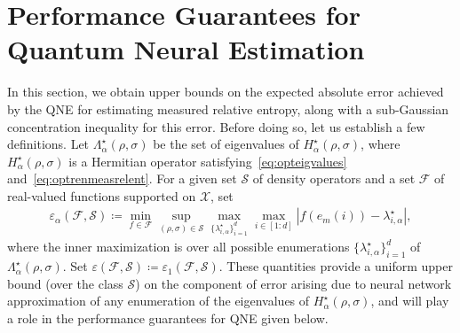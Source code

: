 \documentclass[a4paper,onecolumn,11pt,accepted=2026-05-12]{quantumarticle}
\newcommand{\abs}[1]{\left\vert#1\right\vert}
\newcommand{\cF}{\mathcal{F}}
\newcommand{\cS}{\mathcal{S}}
\newcommand{\cX}{\mathcal{X}}
\begin{document}
 \section{Performance Guarantees for Quantum Neural Estimation}\label{Sec:minimaxriskbnds}
 In this section, we obtain upper bounds on the expected absolute error achieved by the QNE for estimating measured relative entropy, along with a sub-Gaussian  concentration inequality for this error. 
Before doing so, let us establish a few definitions. 
Let  $\Lambda_{\alpha}^{\star}(\rho,\sigma)$  be the set of eigenvalues of $H_{\alpha}^{\star}(\rho,\sigma)$, where $H_{\alpha}^{\star}(\rho,\sigma)$ is a Hermitian operator satisfying~\eqref{eq:opteigvalues} and~\eqref{eq:optrenmeasrelent}. For a given set $ \cS$ of density operators and a set $\cF$ of real-valued functions supported on $\cX$, set 
   \begin{align}
     \varepsilon_{\alpha}(\cF,\cS) \coloneqq \min_{f \in \cF} \sup_{(\rho,\sigma) \in \cS}\max_{\{\lambda_{i,\alpha}^{\star}\}_{i=1}^d }\max_{i \in [1:d]} \abs{f(e_m(i))-\lambda_{i,\alpha}^{\star}},\label{eq:approxcond} 
   \end{align} 
   where the inner maximization is over all possible enumerations $\{\lambda_{i,\alpha}^{\star}\}_{i=1}^d$ of $\Lambda_{\alpha}^{\star}(\rho,\sigma)$. Set $\varepsilon(\cF,\cS) \coloneqq   \varepsilon_{1}(\cF,\cS)$. These quantities provide a uniform upper bound  (over the class $\cS$) on the component of error arising due to neural network approximation of any enumeration of the eigenvalues of $H_{\alpha}^{\star}(\rho,\sigma)$, and will play a role in the performance guarantees for QNE given below. 
\end{document}
